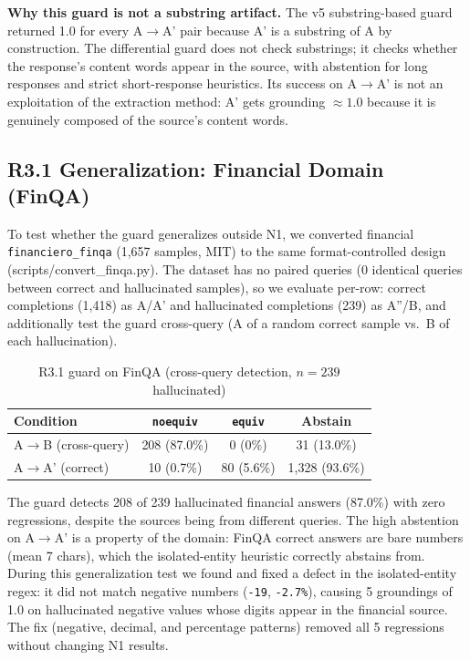 \documentclass[11pt,a4paper]{article}
\begin{document}
\textbf{Why this guard is not a substring artifact.} The v5 substring-based guard returned 1.0 for every A$\rightarrow$A' pair because A' is a substring of A by construction. The differential guard does not check substrings; it checks whether the response's content words appear in the source, with abstention for long responses and strict short-response heuristics. Its success on A$\rightarrow$A' is not an exploitation of the extraction method: A' gets grounding $\approx 1.0$ because it is genuinely composed of the source's content words.

\subsection{R3.1 Generalization: Financial Domain (FinQA)}
\label{sec:r31-finqa}

To test whether the guard generalizes outside N1, we converted financial \texttt{financiero\_finqa} (1{,}657 samples, MIT) to the same format-controlled design (scripts/convert\_finqa.py). The dataset has no paired queries (0 identical queries between correct and hallucinated samples), so we evaluate per-row: correct completions (1{,}418) as A/A' and hallucinated completions (239) as A''/B, and additionally test the guard cross-query (A of a random correct sample vs.\ B of each hallucination).

\begin{table}[H]
\centering
\caption{R3.1 guard on FinQA (cross-query detection, $n = 239$ hallucinated)}
\label{tab:r31-finqa}
\begin{tabular}{@{}lccc@{}}
\toprule
Condition & \texttt{noequiv} & \texttt{equiv} & Abstain \\
\midrule
A$\rightarrow$B (cross-query) & 208 (87.0\%) & 0 (0\%) & 31 (13.0\%) \\
A$\rightarrow$A' (correct)      & 10 (0.7\%)   & 80 (5.6\%) & 1{,}328 (93.6\%) \\
\bottomrule
\end{tabular}
\end{table}

The guard detects 208 of 239 hallucinated financial answers (87.0\%) with zero regressions, despite the sources being from different queries. The high abstention on A$\rightarrow$A' is a property of the domain: FinQA correct answers are bare numbers (mean 7 chars), which the isolated-entity heuristic correctly abstains from. During this generalization test we found and fixed a defect in the isolated-entity regex: it did not match negative numbers (\texttt{-19}, \texttt{-2.7\%}), causing 5 groundings of 1.0 on hallucinated negative values whose digits appear in the financial source. The fix (negative, decimal, and percentage patterns) removed all 5 regressions without changing N1 results.
\end{document}
